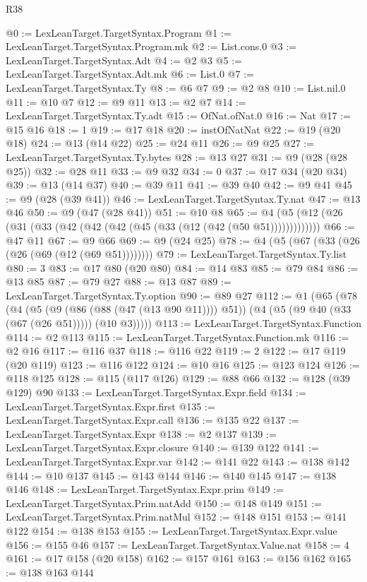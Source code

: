 \begin{lexlean}{R38}
\begin{coremodule}
@0 := LexLeanTarget.TargetSyntax.Program
@1 := LexLeanTarget.TargetSyntax.Program.mk
@2 := List.cons.{0}
@3 := LexLeanTarget.TargetSyntax.Adt
@4 := @2 @3
@5 := LexLeanTarget.TargetSyntax.Adt.mk
@6 := List.{0}
@7 := LexLeanTarget.TargetSyntax.Ty
@8 := @6 @7
@9 := @2 @8
@10 := List.nil.{0}
@11 := @10 @7
@12 := @9 @11
@13 := @2 @7
@14 := LexLeanTarget.TargetSyntax.Ty.adt
@15 := OfNat.ofNat.{0}
@16 := Nat
@17 := @15 @16
@18 := 1
@19 := @17 @18
@20 := instOfNatNat
@22 := @19 (@20 @18)
@24 := @13 (@14 @22)
@25 := @24 @11
@26 := @9 @25
@27 := LexLeanTarget.TargetSyntax.Ty.bytes
@28 := @13 @27
@31 := @9 (@28 (@28 @25))
@32 := @28 @11
@33 := @9 @32
@34 := 0
@37 := @17 @34 (@20 @34)
@39 := @13 (@14 @37)
@40 := @39 @11
@41 := @39 @40
@42 := @9 @41
@45 := @9 (@28 (@39 @41))
@46 := LexLeanTarget.TargetSyntax.Ty.nat
@47 := @13 @46
@50 := @9 (@47 (@28 @41))
@51 := @10 @8
@65 := @4 (@5 (@12 (@26 (@31 (@33 (@42 (@42 (@42 (@45 (@33 (@12 (@42 (@50 @51)))))))))))))
@66 := @47 @11
@67 := @9 @66
@69 := @9 (@24 @25)
@78 := @4 (@5 (@67 (@33 (@26 (@26 (@69 (@12 (@69 @51))))))))
@79 := LexLeanTarget.TargetSyntax.Ty.list
@80 := 3
@83 := @17 @80 (@20 @80)
@84 := @14 @83
@85 := @79 @84
@86 := @13 @85
@87 := @79 @27
@88 := @13 @87
@89 := LexLeanTarget.TargetSyntax.Ty.option
@90 := @89 @27
@112 := @1
    (@65
      (@78
        (@4
          (@5 (@9 (@86 (@88 (@47 (@13 @90 @11)))) @51))
          (@4 (@5 (@9 @40 (@33 (@67 (@26 @51))))) (@10 @3)))))
@113 := LexLeanTarget.TargetSyntax.Function
@114 := @2 @113
@115 := LexLeanTarget.TargetSyntax.Function.mk
@116 := @2 @16
@117 := @116 @37
@118 := @116 @22
@119 := 2
@122 := @17 @119 (@20 @119)
@123 := @116 @122
@124 := @10 @16
@125 := @123 @124
@126 := @118 @125
@128 := @115 (@117 @126)
@129 := @88 @66
@132 := @128 (@39 @129) @90
@133 := LexLeanTarget.TargetSyntax.Expr.field
@134 := LexLeanTarget.TargetSyntax.Expr.first
@135 := LexLeanTarget.TargetSyntax.Expr.call
@136 := @135 @22
@137 := LexLeanTarget.TargetSyntax.Expr
@138 := @2 @137
@139 := LexLeanTarget.TargetSyntax.Expr.closure
@140 := @139 @122
@141 := LexLeanTarget.TargetSyntax.Expr.var
@142 := @141 @22
@143 := @138 @142
@144 := @10 @137
@145 := @143 @144
@146 := @140 @145
@147 := @138 @146
@148 := LexLeanTarget.TargetSyntax.Expr.prim
@149 := LexLeanTarget.TargetSyntax.Prim.natAdd
@150 := @148 @149
@151 := LexLeanTarget.TargetSyntax.Prim.natMul
@152 := @148 @151
@153 := @141 @122
@154 := @138 @153
@155 := LexLeanTarget.TargetSyntax.Expr.value
@156 := @155 @46
@157 := LexLeanTarget.TargetSyntax.Value.nat
@158 := 4
@161 := @17 @158 (@20 @158)
@162 := @157 @161
@163 := @156 @162
@165 := @138 @163 @144

\end{coremodule}
\end{lexlean}
